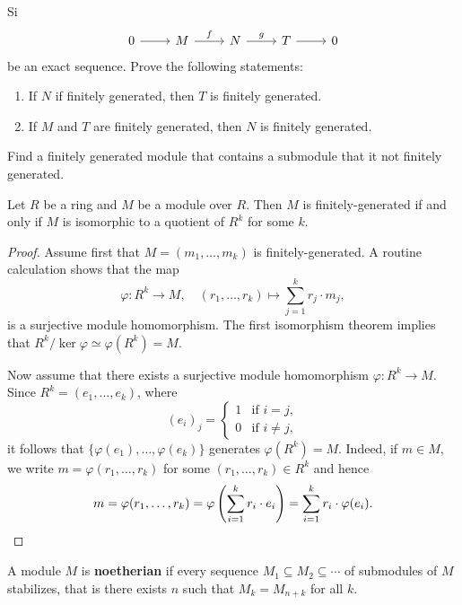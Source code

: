 \begin{exercise}
	Si  
\[\begin{tikzcd}
	0 & M & N & T & 0
	\arrow[from=1-1, to=1-2]
	\arrow["f", from=1-2, to=1-3]
	\arrow["g", from=1-3, to=1-4]
	\arrow[from=1-4, to=1-5]
\end{tikzcd}
\]
     be an exact sequence. Prove the following statements: 
     \begin{enumerate}
     \item If $N$ if finitely generated, then $T$ is finitely generated. 
     \item If $M$ and $T$ are finitely generated, then $N$ is finitely generated. 	
     \end{enumerate}
\end{exercise}

Find a finitely generated module that contains a submodule that 
it not finitely generated. 

\begin{proposition}
    Let $R$ be a ring and $M$ be a module over $R$. 
    Then $M$ is finitely-generated if and only 
    if $M$ is isomorphic to a quotient of $R^k$ for some $k$.
\end{proposition}

\begin{proof}
    Assume first that $M=(m_1,\dots,m_k)$ is finitely-generated. A routine calculation shows that
    the map
    \[
    \varphi\colon R^k\to M,\quad
    (r_1,\dots,r_k)\mapsto \sum_{j=1}^kr_j\cdot m_j,
    \]
    is a surjective module homomorphism. The first isomorphism theorem implies that 
    $R^k/\ker\varphi\simeq\varphi(R^k)=M$. 
    
    Now assume that there exists a 
    surjective module homomorphism $\varphi\colon R^k\to M$. Since 
    $R^k=(e_1,\dots,e_k)$, where 
    \[
    (e_i)_j=\begin{cases}
    1 & \text{if $i=j$},\\
    0 & \text{if $i\ne j$},
    \end{cases}
    \]
    it follows that $\{\varphi(e_1),\dots,\varphi(e_k)\}$ generates $\varphi(R^k)=M$. Indeed, 
    if $m\in M$, we write $m=\varphi(r_1,\dots,r_k)$ for some $(r_1,\dots,r_k)\in R^k$ 
    and hence 
    \[
    m=\varphi(r_1,\dots,r_k)=\varphi\left(\sum_{i=1}^k r_i\cdot e_i\right)
    =\sum_{i=1}^kr_i\cdot\varphi(e_i).\qedhere
    \]
\end{proof}

\begin{definition}
    A module $M$ is \textbf{noetherian} if every sequence $M_1\subseteq M_2\subseteq\cdots$ of submodules of $M$ 
    stabilizes, that is there exists $n$ such that $M_k=M_{n+k}$ for all $k$. 	
\end{definition}

